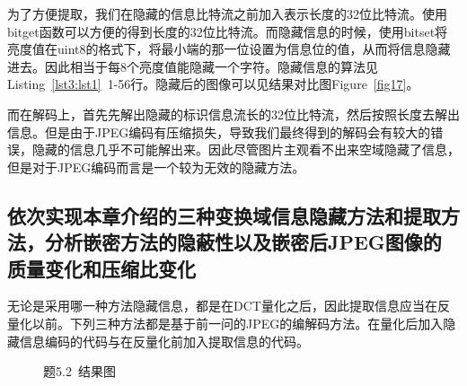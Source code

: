 \documentclass[a4paper]{article}
\begin{document}
		为了方便提取，我们在隐藏的信息比特流之前加入表示长度的32位比特流。使用bitget函数可以方便的得到长度的32位比特流。而隐藏信息的时候，使用bitset将亮度值在uint8的格式下，将最小端的那一位设置为信息位的值，从而将信息隐藏进去。因此相当于每8个亮度值能隐藏一个字符。隐藏信息的算法见Listing~\ref{lst3:lst1}~1-56行。隐藏后的图像可以见结果对比图Figure~\ref{fig17}。
		
		而在解码上，首先先解出隐藏的标识信息流长的32位比特流，然后按照长度去解出信息。但是由于JPEG编码有压缩损失，导致我们最终得到的解码会有较大的错误，隐藏的信息几乎不可能解出来。因此尽管图片主观看不出来空域隐藏了信息，但是对于JPEG编码而言是一个较为无效的隐藏方法。
		
		
		
		\subsection{依次实现本章介绍的三种变换域信息隐藏方法和提取方法，分析嵌密方法的隐蔽性以及嵌密后JPEG图像的质量变化和压缩比变化}
			
		无论是采用哪一种方法隐藏信息，都是在DCT量化之后，因此提取信息应当在反量化以前。下列三种方法都是基于前一问的JPEG的编解码方法。在量化后加入隐藏信息编码的代码与在反量化前加入提取信息的代码。
		
		\begin{figure}[t]
			\centering
			\hspace{0.2cm}
			\hspace{0.2cm}
			\caption{题5.2~结果图}
			\label{fig10}
		\end{figure}
		
\end{document}
